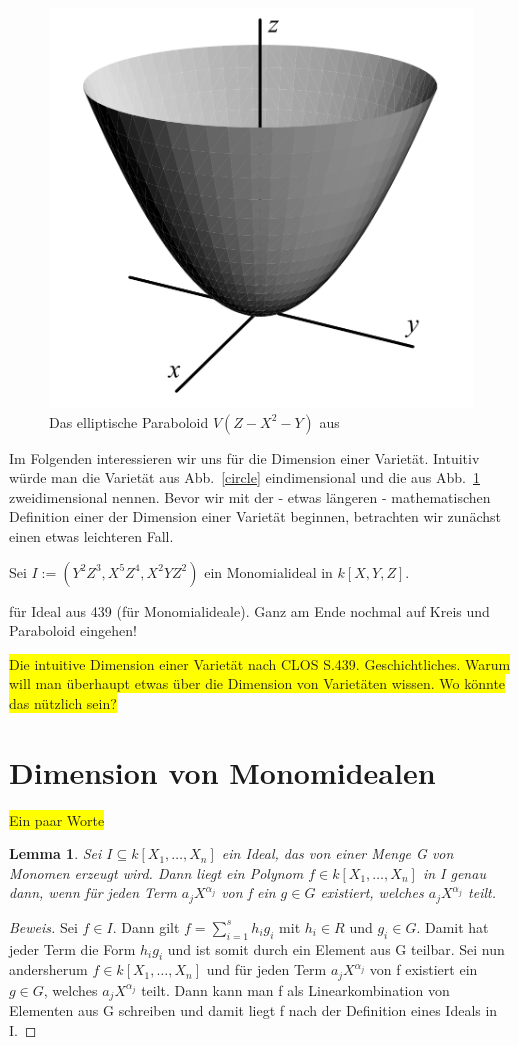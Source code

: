 \documentclass{article}
\newtheorem{lemma}[satz]{Lemma}
\newcommand*{\R}{k[X_{1},\ldots,X_{n}]}
\begin{document}
	\begin{figure}[ht]
		\centering
		\includegraphics[width=.5\linewidth]{paraboloid.png}
		\caption{Das elliptische Paraboloid \(V(Z - X^2 -Y)\) aus \cite{CLOS}}
		\label{paraboloid}
	\end{figure}

	Im Folgenden interessieren wir uns für die Dimension einer Varietät. Intuitiv würde man
	die Varietät aus Abb.~\ref{circle} eindimensional und die aus Abb.~\ref{paraboloid}
	zweidimensional nennen. Bevor wir mit der - etwas längeren - mathematischen Definition einer
	der Dimension einer Varietät beginnen, betrachten wir zunächst einen etwas leichteren Fall.
	
	Sei \(I := (Y^2Z^3, X^5Z^4, X^2YZ^2)\) ein Monomialideal in \(k[X,Y,Z]\).

	
	für Ideal aus 439 (für Monomialideale).
	Ganz am Ende nochmal auf Kreis und Paraboloid eingehen!
	
	\colorbox{yellow}{Die intuitive Dimension einer Varietät nach CLOS S.439.
	Geschichtliches. Warum will man überhaupt etwas über die Dimension von Varietäten wissen.
	Wo könnte das nützlich sein?}

\section{Dimension von Monomidealen}
	
	\colorbox{yellow}{Ein paar Worte}

	\begin{lemma} \label{1.2.3}
	Sei \(I \subseteq \R\) ein Ideal, das von einer Menge G von Monomen erzeugt wird. Dann liegt
	ein Polynom \(f \in \R\) in I genau dann, wenn für jeden Term \(a_{j}X^{\alpha_{j}}\) von f ein
	\(g \in G\) existiert, welches \(a_{j}X^{\alpha_{j}}\) teilt.
	\end{lemma}

	\begin{proof}[Beweis]
	Sei \(f \in I\). Dann gilt \(f = \sum_{i=1}^{s} h_{i}g_{i}\) mit \(h_{i} \in R\) und \(g_{i}
	\in G\). Damit hat jeder Term die Form \(h_{i}g_{i}\) und ist somit durch ein Element aus G
	teilbar.
	Sei nun andersherum \(f \in \R\) und für jeden Term \(a_{j}X^{\alpha_{j}}\) von f existiert ein
	\(g \in G\), welches \(a_{j}X^{\alpha_{j}}\) teilt. Dann kann man f als Linearkombination von 
	Elementen aus G schreiben und damit liegt f nach der Definition eines Ideals in I.
	\end{proof}
\end{document}
